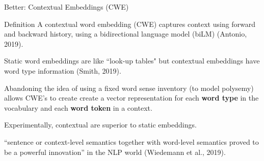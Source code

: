 \begin{frame}{Better: Contextual Embeddings (CWE)}

\begin{definitionBlock}{Definition}
    A \alert{contextual word embedding (CWE)} captures context using forward and backward history, using a bidirectional language model (biLM) (Antonio, 2019). 
    
    Static word embeddings are like ``look-up tables" but contextual embeddings have word type information (Smith, 2019). 
\end{definitionBlock}

\begin{itemizeSpaced}{7pt}

    \item Abandoning the idea of using a fixed word sense inventory (to model polysemy) allows CWE's to create create a vector representation for each \textbf{word type} in the vocabulary and each \textbf{word token} in a context. 
    
    \item Experimentally, contextual are superior to static embeddings.
    
    \item ``sentence or context-level semantics together with word-level semantics proved to be a powerful innovation” in the NLP world (Wiedemann et al., 2019).
    
    
\end{itemizeSpaced}
    
\end{frame}